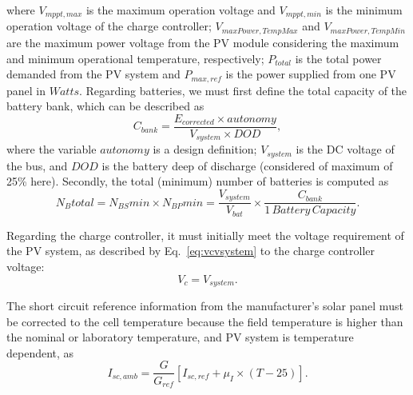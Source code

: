 \documentclass[10pt,conference]{IEEEtran}
\begin{document}
\noindent where $V_{mppt,max}$ is the maximum operation voltage and $V_{mppt,min}$ is the minimum operation voltage of the charge controller; $V_{maxPower,TempMax}$ and $V_{maxPower,TempMin}$ are the maximum power voltage from the PV module considering the maximum and minimum operational temperature, respectively; $P_{total}$ is the total power demanded from the PV system and $P_{max,ref}$ is the power supplied from one PV panel in $Watts$.
%
Regarding batteries, we must first define the total capacity of the battery bank, which can be described as
\begin{equation}
\label{eq:Cbank}
\scriptstyle C_{bank} \scriptstyle = \dfrac{\scriptstyle E_{corrected} \scriptstyle \times \scriptstyle autonomy}{\scriptstyle V_{system} \scriptstyle \times \scriptstyle DOD},
\end{equation}
%
\noindent where the variable $autonomy$ is a design definition; %
$ V_{system} $ is the DC voltage of the bus, and $ DOD $ is the battery deep of discharge (considered of maximum of 25\% here).
%
Secondly, the total (minimum) number of batteries is computed as 
\begin{equation}
\label{eq:Nbtotal}
\scriptstyle N_{B}total = \scriptstyle N_{BS}min \scriptstyle \times \scriptstyle N_{BP}min = \dfrac{\scriptstyle V_{system}}{\scriptstyle V_{bat}} \scriptstyle \times \dfrac{\scriptstyle C_{bank}}{\scriptstyle 1 \,Battery \, Capacity}.
\end{equation}

Regarding the charge controller, it must initially meet the voltage requirement of the PV system, as described by Eq.~\eqref{eq:vcvsystem} to the charge controller voltage: 
\begin{equation}
\label{eq:vcvsystem}
\scriptstyle V_{c} = \scriptstyle V_{system}.
\end{equation}

The short circuit reference information from the manufacturer's solar panel must be corrected to the cell temperature because the field temperature is higher than the nominal or laboratory temperature, and PV system is temperature dependent, as 
%
\begin{equation}
\label{eq:iscamb}
\scriptstyle I_{sc,amb} = \dfrac{\scriptstyle G}{\scriptstyle G_{ref}} \left[ \scriptstyle I_{sc,ref} + \scriptstyle \mu_{I} \scriptstyle \times \scriptstyle (T-25) \right]. 
\end{equation}
\end{document}
